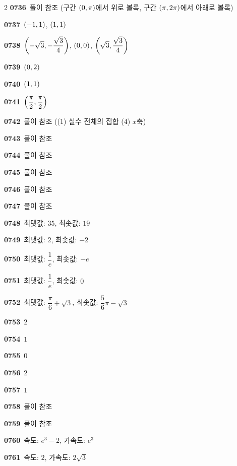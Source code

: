 \documentclass[10pt,a4paper]{article}
\begin{document}
\begin{multicols}{2}
\noindent\textbf{0736}\ 풀이 참조 (구간 $(0{,}\mkern3mu\mathopen{}\pi)$에서 위로 볼록, 구간 $(\pi{,}\mkern3mu\mathopen{}2\pi)$에서 아래로 볼록)\par
\noindent\textbf{0737}\ $(-1{,}\mkern3mu\mathopen{}1)$, $(1{,}\mkern3mu\mathopen{}1)$\par
\noindent\textbf{0738}\ $\left(-\sqrt{3}{,}\mkern3mu\mathopen{}-\dfrac{\sqrt{3}}{4}\right)$, $(0{,}\mkern3mu\mathopen{}0)$, $\left(\sqrt{3}{,}\mkern3mu\mathopen{}\dfrac{\sqrt{3}}{4}\right)$\par
\noindent\textbf{0739}\ $(0{,}\mkern3mu\mathopen{}2)$\par
\noindent\textbf{0740}\ $(1{,}\mkern3mu\mathopen{}1)$\par
\noindent\textbf{0741}\ $\left(\dfrac{\pi}{2}{,}\mkern3mu\mathopen{}\dfrac{\pi}{2}\right)$\par
\noindent\textbf{0742}\ 풀이 참조 ((1) 실수 전체의 집합 (4) $x$축)\par
\noindent\textbf{0743}\ 풀이 참조\par
\noindent\textbf{0744}\ 풀이 참조\par
\noindent\textbf{0745}\ 풀이 참조\par
\noindent\textbf{0746}\ 풀이 참조\par
\noindent\textbf{0747}\ 풀이 참조\par
\noindent\textbf{0748}\ 최댓값: $35$, 최솟값: $19$\par
\noindent\textbf{0749}\ 최댓값: $2$, 최솟값: $-2$\par
\noindent\textbf{0750}\ 최댓값: $\dfrac{1}{e}$, 최솟값: $-e$\par
\noindent\textbf{0751}\ 최댓값: $\dfrac{1}{e}$, 최솟값: $0$\par
\noindent\textbf{0752}\ 최댓값: $\dfrac{\pi}{6}+\sqrt{3}$, 최솟값: $\dfrac{5}{6}\pi-\sqrt{3}$\par
\noindent\textbf{0753}\ $2$\par
\noindent\textbf{0754}\ $1$\par
\noindent\textbf{0755}\ $0$\par
\noindent\textbf{0756}\ $2$\par
\noindent\textbf{0757}\ $1$\par
\noindent\textbf{0758}\ 풀이 참조\par
\noindent\textbf{0759}\ 풀이 참조\par
\noindent\textbf{0760}\ 속도: $e^3-2$, 가속도: $e^3$\par
\noindent\textbf{0761}\ 속도: $2$, 가속도: $2\sqrt{3}$\par

\end{multicols}
\end{document}
